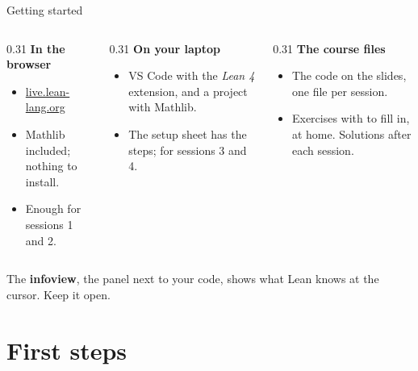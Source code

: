 \documentclass[10pt, aspectratio=169]{beamer}
\begin{document}
\begin{frame}[fragile]{Getting started}
\begin{columns}[T]
\begin{column}{0.31\textwidth}
\textbf{\color{leanblue}In the browser}
\begin{itemize}
\item \href{https://live.lean-lang.org}{live.lean-lang.org}
\item Mathlib included; nothing to install.
\item Enough for sessions 1 and 2.
\end{itemize}
\end{column}
\begin{column}{0.31\textwidth}
\textbf{\color{leanblue}On your laptop}
\begin{itemize}
\item VS Code with the \emph{Lean 4} extension, and a project with Mathlib.
\item The setup sheet has the steps; for sessions 3 and 4.
\end{itemize}
\end{column}
\begin{column}{0.31\textwidth}
\textbf{\color{leanblue}The course files}
\begin{itemize}
\item The code on the slides, one file per session.
\item Exercises with  to fill in, at home. Solutions after each session.
\end{itemize}
\end{column}
\end{columns}

\vspace{0.6em}
\begin{keypoint}
\normalsize The \textbf{infoview}, the panel next to your code, shows what Lean knows at the cursor. Keep it open.
\end{keypoint}
\end{frame}

\section{First steps}
\end{document}
